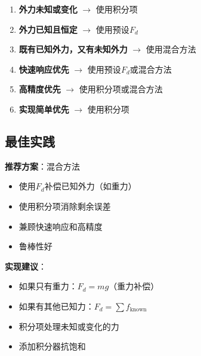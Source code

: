 \documentclass[12pt,a4paper]{article}
\begin{document}
\begin{enumerate}
\item \textbf{外力未知或变化} $\to$ 使用积分项
\item \textbf{外力已知且恒定} $\to$ 使用预设$F_d$
\item \textbf{既有已知外力，又有未知外力} $\to$ 使用混合方法
\item \textbf{快速响应优先} $\to$ 使用预设$F_d$或混合方法
\item \textbf{高精度优先} $\to$ 使用积分项或混合方法
\item \textbf{实现简单优先} $\to$ 使用积分项
\end{enumerate}

\subsection{最佳实践}

\textbf{推荐方案}：混合方法
\begin{itemize}
\item 使用$F_d$补偿已知外力（如重力）
\item 使用积分项消除剩余误差
\item 兼顾快速响应和高精度
\item 鲁棒性好
\end{itemize}

\textbf{实现建议}：
\begin{itemize}
\item 如果只有重力：$F_d = mg$（重力补偿）
\item 如果有其他已知力：$F_d = \sum f_{\text{known}}$
\item 积分项处理未知或变化的力
\item 添加积分器抗饱和
\end{itemize}
\end{document}
